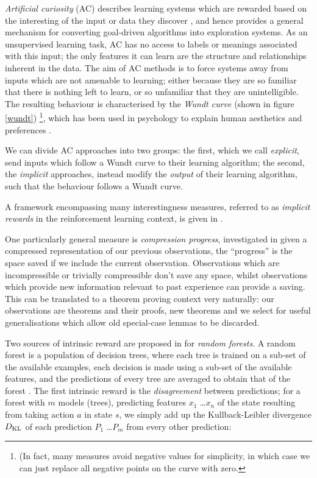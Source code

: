\documentclass[]{article}
\begin{document}
\emph{Artificial curiosity} (AC) describes learning systems which are rewarded based on the interesting of the input or data they discover \cite{schmidhuber2006developmental}, and hence provides a general mechanism for converting goal-driven algorithms into exploration systems. As an unsupervised learning task, AC has no access to labels or meanings associated with this input; the only features it can learn are the structure and relationships inherent in the data. The aim of AC methods is to force systems away from inputs which are not amenable to learning; either because they are so familiar that there is nothing left to learn, or so unfamiliar that they are unintelligible. The resulting behaviour is characterised by the \emph{Wundt curve} (shown in figure \ref{wundt}) \footnote{(In fact, many measures avoid negative values for simplicity, in which case we can just replace all negative points on the curve with zero.}, which has been used in psychology to explain human aesthetics and preferences \cite{berlyne1970novelty}.

We can divide AC approaches into two groups: the first, which we call \emph{explicit}, send inputs which follow a Wundt curve to their learning algorithm; the second, the \emph{implicit} approaches, instead modify the \emph{output} of their learning algorithm, such that the behaviour follows a Wundt curve.

A framework encompassing many interestingness measures, referred to as \emph{implicit rewards} in the reinforcement learning context, is given in \cite{oudeyer2007intrinsic}.

One particularly general measure is \emph{compression progress}, investigated in  given a compressed representation of our previous observations, the ``progress'' is the space saved if we include the current observation. Observations which are incompressible or trivially compressible don't save any space, whilst observations which provide new information relevant to past experience can provide a saving. This can be translated to a theorem proving context very naturally: our observations are theorems and their proofs, new theorems and we select for useful generalisations which allow old special-case lemmas to be discarded.


Two sources of intrinsic reward are proposed in \cite{Hester.Stone:2012} for \emph{random forests}. A random forest is a population of decision trees, where each tree is trained on a sub-set of the available examples, each decision is made using a sub-set of the available features, and the predictions of every tree are averaged to obtain that of the forest \cite{randomforests}. The first intrinsic reward is the \emph{disagreement} between predictions; for a forest with $m$ models (trees), predicting features $x_1$ \dots $x_n$ of the state resulting from taking action $a$ in state $s$, we simply add up the Kullback-Leibler divergence $D_{\rm KL}$ of each prediction $P_1$ \dots $P_m$ from every other prediction:
\end{document}
